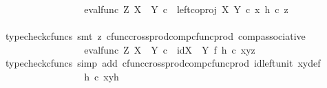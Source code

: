 \begin{isabellebody}
\ \ \ \ \ \ \ \ \ \ \ \ \isamarkupfalse%
\ \isamarkupfalse%
\ {\isachardoublequoteopen}{\isachardot}{\kern0pt}{\isachardot}{\kern0pt}{\isachardot}{\kern0pt}\ {\isacharequal}{\kern0pt}\ eval{\isacharunderscore}{\kern0pt}func\ Z\ {\isacharparenleft}{\kern0pt}X\ {\isasymCoprod}\ Y{\isacharparenright}{\kern0pt}\ {\isasymcirc}\isactrlsub c\ \ {\isasymlangle}left{\isacharunderscore}{\kern0pt}coproj\ X\ Y\ {\isasymcirc}\isactrlsub c\ x{\isacharcomma}{\kern0pt}\ h\ {\isasymcirc}\isactrlsub c\ z{\isasymrangle}{\isachardoublequoteclose}\isanewline
\ \ \ \ \ \ \ \ \ \ \ \ \ \ \isamarkupfalse%
\ {\isacharparenleft}{\kern0pt}typecheck{\isacharunderscore}{\kern0pt}cfuncs{\isacharcomma}{\kern0pt}\ smt\ {\isacharparenleft}{\kern0pt}z{}{\isacharparenright}{\kern0pt}\ cfunc{\isacharunderscore}{\kern0pt}cross{\isacharunderscore}{\kern0pt}prod{\isacharunderscore}{\kern0pt}comp{\isacharunderscore}{\kern0pt}cfunc{\isacharunderscore}{\kern0pt}prod\ comp{\isacharunderscore}{\kern0pt}associative{}{\isacharparenright}{\kern0pt}\isanewline
\ \ \ \ \ \ \ \ \ \ \ \ \isamarkupfalse%
\ \isamarkupfalse%
\ {\isachardoublequoteopen}{\isachardot}{\kern0pt}{\isachardot}{\kern0pt}{\isachardot}{\kern0pt}\ {\isacharequal}{\kern0pt}\ eval{\isacharunderscore}{\kern0pt}func\ Z\ {\isacharparenleft}{\kern0pt}X\ {\isasymCoprod}\ Y{\isacharparenright}{\kern0pt}\ {\isasymcirc}\isactrlsub c\ \ {\isacharparenleft}{\kern0pt}{\isacharparenleft}{\kern0pt}id{\isacharparenleft}{\kern0pt}X\ {\isasymCoprod}\ Y{\isacharparenright}{\kern0pt}\ {\isasymtimes}\isactrlsub f\ h{\isacharparenright}{\kern0pt}\ {\isasymcirc}\isactrlsub c\ {\isasymlangle}xy{\isacharcomma}{\kern0pt}z{\isasymrangle}{\isacharparenright}{\kern0pt}{\isachardoublequoteclose}\isanewline
\ \ \ \ \ \ \ \ \ \ \ \ \ \ \isamarkupfalse%
\ {\isacharparenleft}{\kern0pt}typecheck{\isacharunderscore}{\kern0pt}cfuncs{\isacharcomma}{\kern0pt}\ simp\ add{\isacharcolon}{\kern0pt}\ cfunc{\isacharunderscore}{\kern0pt}cross{\isacharunderscore}{\kern0pt}prod{\isacharunderscore}{\kern0pt}comp{\isacharunderscore}{\kern0pt}cfunc{\isacharunderscore}{\kern0pt}prod\ id{\isacharunderscore}{\kern0pt}left{\isacharunderscore}{\kern0pt}unit{}\ xy{\isacharunderscore}{\kern0pt}def{\isacharparenright}{\kern0pt}\isanewline
\ \ \ \ \ \ \ \ \ \ \ \ \isamarkupfalse%
\ \isamarkupfalse%
\ {\isachardoublequoteopen}{\isachardot}{\kern0pt}{\isachardot}{\kern0pt}{\isachardot}{\kern0pt}\ {\isacharequal}{\kern0pt}\ h\isactrlsup {\isasymflat}\ {\isasymcirc}\isactrlsub c\ xyh{\isachardoublequoteclose}\isanewline

\end{isabellebody}
